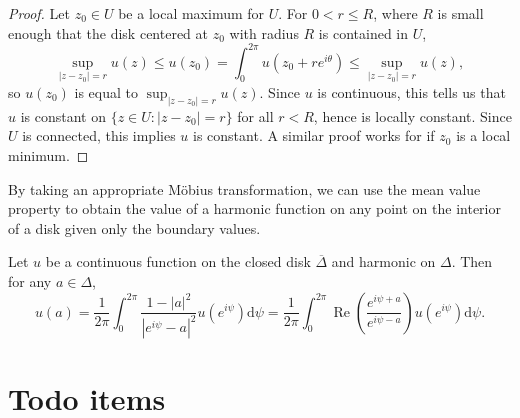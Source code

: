 \documentclass[10pt]{article}
\providecommand{\ol}{\overline}
\providecommand{\dd}{\mathrm d}
\providecommand{\opname}{\operatorname}
\providecommand{\abs}[1]{\left\lvert{#1}\right\rvert}
\begin{document}
\begin{proof}
    Let $z_0\in U$ be a local maximum for $U$.
    For $0 < r \le R$, where $R$ is small enough that
    the disk centered at $z_0$ with radius $R$ is contained in $U$,
    \begin{equation*}
	\sup_{\abs{z-z_0} = r} u(z) \le u(z_0)
	= \int_0^{2\pi} u(z_0 + re^{i\theta})
	\le \sup_{\abs{z-z_0} = r} u(z),
    \end{equation*}
    so $u(z_0)$ is equal to $\sup_{\abs{z-z_0}=r}u(z)$.
    Since $u$ is continuous, this tells us that
    $u$ is constant on $\{z\in U : \abs{z-z_0} = r\}$
    for all $r < R$, hence is locally constant.
    Since $U$ is connected, this implies $u$ is constant.
    A similar proof works for if $z_0$ is a local minimum.
\end{proof}

By taking an appropriate M\"obius transformation,
we can use the mean value property
to obtain the value of a harmonic function
on any point on the interior of a disk
given only the boundary values.
\begin{theorem}
    \label{thm:poisson-formulas}
    Let $u$ be a continuous function on the closed disk
    $\ol\Delta$ and harmonic on $\Delta$. Then for any $a\in\Delta$,
    \begin{equation*}
	u(a) = \frac 1{2\pi}\int_0^{2\pi}
	\frac{1 - \abs a^2}{\abs{e^{i\psi} - a}^2} u(e^{i\psi})\dd\psi
	= \frac 1{2\pi}\int_0^{2\pi}
	\opname{Re}\left(\frac{e^{i\psi + a}}{e^{i\psi-a}}\right)
	u(e^{i\psi})\dd\psi.
    \end{equation*}
\end{theorem}



\pagebreak
\section{Todo items}
\listoftodos
\end{document}
